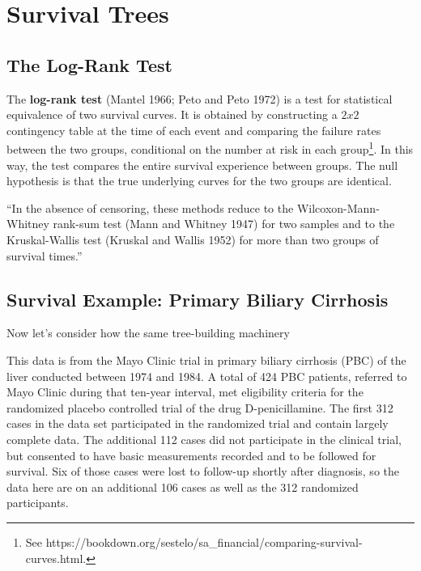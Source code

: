 \chapter{Survival Trees}




\section{The Log-Rank Test}

The \textbf{log-rank test} (Mantel 1966; Peto and Peto 1972) is a test for statistical equivalence of two survival curves. It is obtained by constructing a $2x2$ contingency table at the time of each event and comparing the failure rates between the two groups, conditional on the number at risk in each group\footnote{See https://bookdown.org/sestelo/sa\_financial/comparing-survival-curves.html.}. In this way, the test compares the entire survival experience between groups. The null hypothesis is that the true underlying curves for the two groups are identical.

``In the absence of censoring, these methods reduce to the Wilcoxon-Mann-Whitney rank-sum test (Mann and Whitney 1947) for two samples and to the Kruskal-Wallis test (Kruskal and Wallis 1952) for more than two groups of survival times.''




\section{Survival Example: Primary Biliary Cirrhosis}

Now let's consider how the same tree-building machinery 

This data is from the Mayo Clinic trial in primary biliary cirrhosis (PBC) of the liver conducted between 1974 and 1984. A total of 424 PBC patients, referred to Mayo Clinic during that ten-year interval, met eligibility criteria for the randomized placebo controlled trial of the drug D-penicillamine. The first 312 cases in the data set participated in the randomized trial and contain largely complete data. The additional 112 cases did not participate in the clinical trial, but consented to have basic measurements recorded and to be followed for survival. Six of those cases were lost to follow-up shortly after diagnosis, so the data here are on an additional 106 cases as well as the 312 randomized participants.



